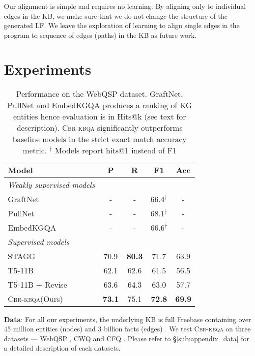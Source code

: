 \documentclass[11pt]{article}
\newcommand{\alg}{\textsc{Cbr-kbqa}\xspace}
\begin{document}
Our alignment is simple and requires no learning. By aligning only to individual edges in the KB, we make sure that we do not change the structure of the generated LF. We leave the exploration of learning to align single edges in the program to sequence of edges (paths) in the KB as future work. 
 
\section{Experiments}
\label{sec:experiments}
\begin{table}[t]
\centering
    \footnotesize
    \setlength{\tabcolsep}{3pt}
    \begin{tabular}{@{}l@{\hskip 0pt}c c c c@{}}
    \toprule
    Model & P & R & F1 & Acc\\\midrule
    \textit{Weakly supervised models} & & & & \\\midrule
GraftNet \cite{sun2018open} & - & - & 66.4\ensuremath{^\dagger} & - \\
    PullNet \cite{sun2019pullnet} & - & - & 68.1\ensuremath{^\dagger} & - \\
    EmbedKGQA \cite{saxena2020improving} & - & - & 66.6\ensuremath{^\dagger} & - \\
    \midrule
    \textit{Supervised models} & & & & \\\midrule
    STAGG \cite{yih2016value} & 70.9 & \textbf{80.3} & 71.7 & 63.9\\
    T5-11B \cite{t5} &62.1 & 62.6& 61.5& 56.5\\
    T5-11B + Revise &63.6 & 64.3& 63.0& 57.7\\
    \alg (Ours) & \textbf{73.1} & 75.1 & \textbf{72.8} & \textbf{69.9}\\\bottomrule
    
    \end{tabular}
    \caption{Performance on the WebQSP dataset. GraftNet, PullNet and EmbedKGQA produces a ranking of KG entities hence evaluation is in Hits@k (see text for description). \alg significantly outperforms baseline models in the strict exact match accuracy metric. \ensuremath{^\dagger} Models report hits@1 instead of F1}
    \label{tab:webqsp_results}
    \vspace{-3mm}
\end{table}

\noindent\textbf{Data}: For all our experiments, the underlying KB is full Freebase containing over 45 million entities (nodes) and 3 billion facts (edges) \cite{fb}. We test \alg on three datasets --- WebQSP \cite{yih2016value}, CWQ \cite{Talmor2018TheWA} and CFQ \cite{keysers2020measuring}. Please refer to \S\ref{sub:appendix_data} for a detailed description of each datasets.
\end{document}
